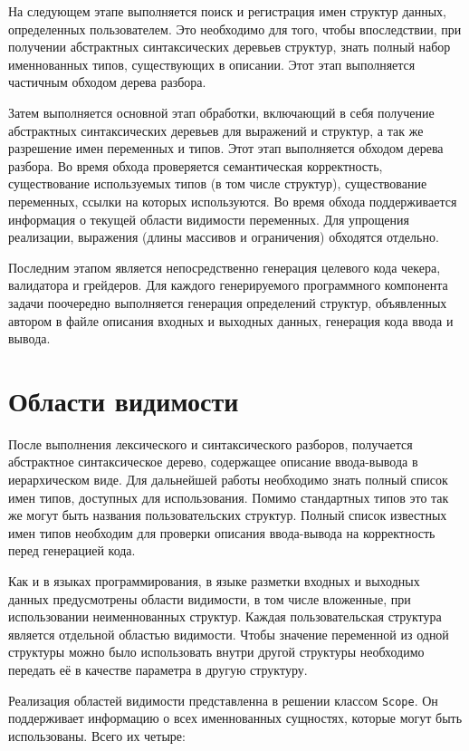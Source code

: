 \documentclass[times,specification,annotation]{style/itmo-student-thesis/itmo-student-thesis}
\begin{document}
На следующем этапе выполняется поиск и регистрация имен структур данных, определенных пользователем. Это необходимо для того, чтобы впоследствии, при получении абстрактных синтаксических деревьев структур, знать полный набор именнованных типов, существующих в описании. Этот этап выполняется частичным обходом дерева разбора.

Затем выполняется основной этап обработки, включающий в себя получение абстрактных синтаксических деревьев для выражений и структур, а так же разрешение имен переменных и типов. Этот этап выполняется обходом дерева разбора. Во время обхода проверяется семантическая корректность, существование используемых типов (в том числе структур), существование переменных, ссылки на которых используются. Во время обхода поддерживается информация о текущей области видимости переменных. Для упрощения реализации, выражения (длины массивов и ограничения) обходятся отдельно.

Последним этапом является непосредственно генерация целевого кода чекера, валидатора и грейдеров. Для каждого генерируемого программного компонента задачи поочередно выполняется генерация определений структур, объявленных автором в файле описания входных и выходных данных, генерация кода ввода и вывода.

\section{Области видимости}

После выполнения лексического и синтаксического разборов, получается абстрактное синтаксическое дерево, содержащее описание ввода-вывода в иерархическом виде. Для дальнейшей работы необходимо знать полный список имен типов, доступных для использования. Помимо стандартных типов это так же могут быть названия пользовательских структур. Полный список известных имен типов необходим для проверки описания ввода-вывода на корректность перед генерацией кода.

Как и в языках программирования, в языке разметки входных и выходных данных предусмотрены области видимости, в том числе вложенные, при использовании неименнованных структур. Каждая пользовательская структура является отдельной областью видимости. Чтобы значение переменной из одной структуры можно было использовать внутри другой структуры необходимо передать её в качестве параметра в другую структуру.

Реализация областей видимости представленна в решении классом \texttt{Scope}. Он поддерживает информацию о всех именнованных сущностях, которые могут быть использованы. Всего их четыре:
\end{document}
